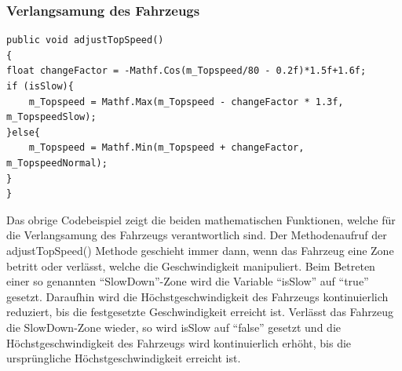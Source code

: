	\subsubsection{Verlangsamung des Fahrzeugs}
	\begin{lstlisting}
public void adjustTopSpeed()
{
float changeFactor = -Mathf.Cos(m_Topspeed/80 - 0.2f)*1.5f+1.6f;
if (isSlow){
    m_Topspeed = Mathf.Max(m_Topspeed - changeFactor * 1.3f, m_TopspeedSlow);
}else{
    m_Topspeed = Mathf.Min(m_Topspeed + changeFactor, m_TopspeedNormal);
}
}
    \end{lstlisting}
    Das obrige Codebeispiel zeigt die beiden mathematischen Funktionen, welche für die Verlangsamung des Fahrzeugs verantwortlich sind. Der Methodenaufruf der adjustTopSpeed() Methode geschieht immer dann, wenn das Fahrzeug eine Zone betritt oder verlässt, welche die Geschwindigkeit manipuliert. Beim Betreten einer so genannten \enquote{SlowDown}-Zone wird die Variable \enquote{isSlow} auf \enquote{true} gesetzt. Daraufhin wird die Höchstgeschwindigkeit des Fahrzeugs kontinuierlich reduziert, bis die festgesetzte Geschwindigkeit erreicht ist. Verlässt das Fahrzeug die SlowDown-Zone wieder, so wird isSlow auf \enquote{false} gesetzt und die Höchstgeschwindigkeit des Fahrzeugs wird kontinuierlich erhöht, bis die ursprüngliche Höchstgeschwindigkeit erreicht ist.

